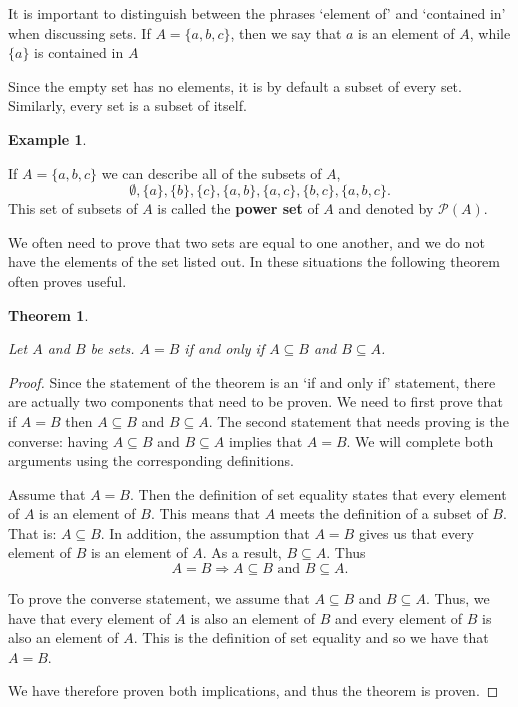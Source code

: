 \documentclass[
]{book}
\newtheorem{theorem}{Theorem}[chapter]
\theoremstyle{definition}
\theoremstyle{definition}
\newtheorem{example}{Example}[chapter]
\theoremstyle{definition}
\theoremstyle{definition}
\theoremstyle{remark}
\begin{document}
It is important to distinguish between the phrases `element of' and `contained in' when discussing sets. If \(A= \{a,b,c\}\), then we say that \(a\) is an element of \(A\), while \(\{a\}\) is contained in \(A\)

Since the empty set has no elements, it is by default a subset of every set. Similarly, every set is a subset of itself.

\begin{example}
\protect\hypertarget{exm:unlabeled-div-4}{}\label{exm:unlabeled-div-4}

If \(A=\{a,b,c\}\) we can describe all of the subsets of \(A\),
\[\emptyset, \{a\}, \{b\}, \{c\}, \{a,b\}, \{a,c\}, \{b,c\}, \{a, b, c\}.\]
This set of subsets of \(A\) is called the \textbf{power set} of \(A\) and denoted by \(\mathcal{P}(A)\).

\end{example}

We often need to prove that two sets are equal to one another, and we do not have the elements of the set listed out. In these situations the following theorem often proves useful.

\begin{theorem}
\protect\hypertarget{thm:set-equality}{}\label{thm:set-equality}

Let \(A\) and \(B\) be sets. \(A=B\) if and only if \(A \subseteq B\) and \(B \subseteq A\).

\end{theorem}

\begin{proof}

Since the statement of the theorem is an `if and only if' statement, there are actually two components that need to be proven. We need to first prove that if \(A=B\) then \(A \subseteq B\) and \(B \subseteq A\). The second statement that needs proving is the converse: having \(A \subseteq B\) and \(B \subseteq A\) implies that \(A=B\). We will complete both arguments using the corresponding definitions.

Assume that \(A=B\). Then the definition of set equality states that every element of \(A\) is an element of \(B\). This means that \(A\) meets the definition of a subset of \(B\). That is: \(A\subseteq B\). In addition, the assumption that \(A=B\) gives us that every element of \(B\) is an element of \(A\). As a result, \(B\subseteq A\). Thus \[A=B \Rightarrow A\subseteq B \mbox{ and } B\subseteq A.\]

To prove the converse statement, we assume that \(A \subseteq B\) and \(B \subseteq A\). Thus, we have that every element of \(A\) is also an element of \(B\) and every element of \(B\) is also an element of \(A\). This is the definition of set equality and so we have that \(A=B\).

We have therefore proven both implications, and thus the theorem is proven.

\end{proof}
\end{document}

